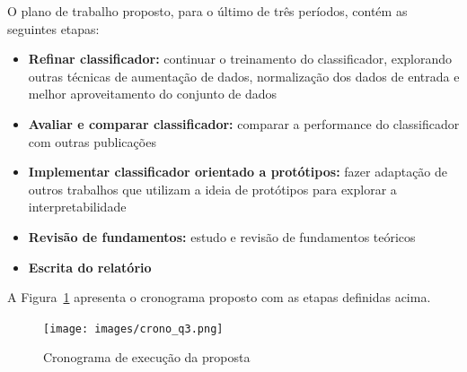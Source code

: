 \documentclass[12pt]{article}
\begin{document}
O plano de trabalho proposto, para o último de três períodos, contém as seguintes etapas:
\begin{itemize}
    \item \textbf{Refinar classificador:} continuar o treinamento do classificador, explorando outras técnicas de aumentação de dados, normalização dos dados de entrada e melhor aproveitamento do conjunto de dados
    \item \textbf{Avaliar e comparar classificador:} comparar a performance do classificador com outras publicações
    \item \textbf{Implementar classificador orientado a protótipos:} fazer adaptação de outros trabalhos que utilizam a ideia de protótipos para explorar a interpretabilidade
    \item \textbf{Revisão de fundamentos:} estudo e revisão de fundamentos teóricos
    \item \textbf{Escrita do relatório}
\end{itemize}

A Figura~\ref{fig:crono} apresenta o cronograma proposto com as etapas definidas acima.

\begin{figure}[htb]
 \centering
 \texttt{[image: images/crono\_q3.png]}
 \caption{Cronograma de execução da proposta}
 \label{fig:crono}
\end{figure}


\bigskip


\end{document}
